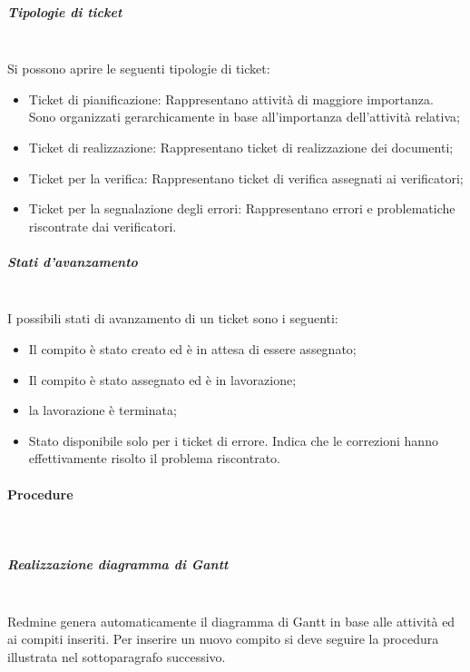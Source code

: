 \subparagraph{Tipologie di ticket} \hfill \\

Si possono aprire le seguenti tipologie di ticket:
\begin{itemize}
\item Ticket di pianificazione: Rappresentano attivit\`{a} di maggiore importanza. Sono organizzati gerarchicamente in base all'importanza dell'attivit\`{a} relativa;
\item Ticket di realizzazione: Rappresentano ticket di realizzazione dei documenti;
\item Ticket per la verifica: Rappresentano ticket di verifica assegnati ai verificatori;
\item Ticket per la segnalazione degli errori: Rappresentano errori e problematiche riscontrate dai verificatori.

\end{itemize}

\subparagraph{Stati d'avanzamento} \hfill \\


I possibili stati di avanzamento di un ticket sono i seguenti:
\begin{itemize}
\item {} Il compito è stato creato ed è in attesa di essere assegnato;
\item {}  Il compito è stato assegnato ed è in lavorazione;
\item {} la lavorazione è terminata;
\item {} Stato disponibile solo per i ticket di errore. Indica che le correzioni hanno effettivamente risolto il problema riscontrato.

\end{itemize}


\paragraph{Procedure} \hfill \\
\label{2}
\subparagraph{Realizzazione diagramma di Gantt} \hfill \\
\label{1}
Redmine genera automaticamente il diagramma di Gantt in base alle attivit\`{a} ed ai compiti inseriti.
Per inserire un nuovo compito si deve seguire la procedura illustrata nel sottoparagrafo successivo.

